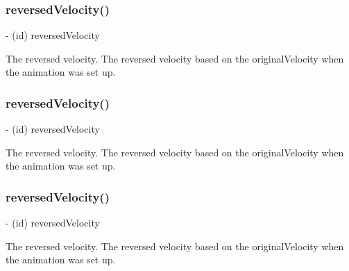 \subsubsection{\texorpdfstring{reversed\+Velocity()}{reversedVelocity()}\hspace{0.1cm}{\footnotesize\ttfamily [1/3]}}
{\footnotesize\ttfamily -\/ (id) reversed\+Velocity \begin{DoxyParamCaption}{ }\end{DoxyParamCaption}}

The reversed velocity.  The reversed velocity based on the original\+Velocity when the animation was set up. \mbox{\label{interface_p_o_p_decay_animation_a2b10ea137ba9122567db921a68365fbe}} 
\subsubsection{\texorpdfstring{reversed\+Velocity()}{reversedVelocity()}\hspace{0.1cm}{\footnotesize\ttfamily [2/3]}}
{\footnotesize\ttfamily -\/ (id) reversed\+Velocity \begin{DoxyParamCaption}{ }\end{DoxyParamCaption}}

The reversed velocity.  The reversed velocity based on the original\+Velocity when the animation was set up. \mbox{\label{interface_p_o_p_decay_animation_a2b10ea137ba9122567db921a68365fbe}} 
\subsubsection{\texorpdfstring{reversed\+Velocity()}{reversedVelocity()}\hspace{0.1cm}{\footnotesize\ttfamily [3/3]}}
{\footnotesize\ttfamily -\/ (id) reversed\+Velocity \begin{DoxyParamCaption}{ }\end{DoxyParamCaption}}

The reversed velocity.  The reversed velocity based on the original\+Velocity when the animation was set up. \mbox{\label{interface_p_o_p_decay_animation_a1bf62f2b436ed5e5846f3a6b1bc0987b}} 

